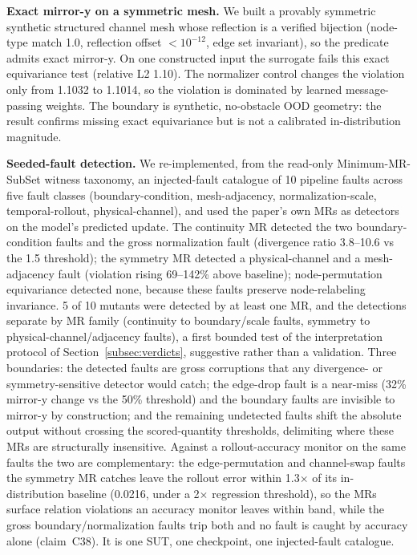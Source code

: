 \documentclass[preprint,12pt]{elsarticle}
\begin{document}
\textbf{Exact mirror-y on a symmetric mesh.} We built a provably symmetric synthetic structured channel mesh whose reflection is a verified bijection (node-type match 1.0, reflection offset $<10^{-12}$, edge set invariant), so the predicate admits exact mirror-y. On one constructed input the surrogate fails this exact equivariance test (relative L2 1.10). The normalizer control changes the violation only from 1.1032 to 1.1014, so the violation is dominated by learned message-passing weights. The boundary is synthetic, no-obstacle OOD geometry: the result confirms missing exact equivariance but is not a calibrated in-distribution magnitude.

\textbf{Seeded-fault detection.} We re-implemented, from the read-only Minimum-MR-SubSet witness taxonomy, an injected-fault catalogue of 10 pipeline faults across five fault classes (boundary-condition, mesh-adjacency, normalization-scale, temporal-rollout, physical-channel), and used the paper's own MRs as detectors on the model's predicted update. The continuity MR detected the two boundary-condition faults and the gross normalization fault (divergence ratio 3.8--10.6 vs the 1.5 threshold); the symmetry MR detected a physical-channel and a mesh-adjacency fault (violation rising 69--142\% above baseline); node-permutation equivariance detected none, because these faults preserve node-relabeling invariance. 5 of 10 mutants were detected by at least one MR, and the detections separate by MR family (continuity to boundary/scale faults, symmetry to physical-channel/adjacency faults), a first bounded test of the interpretation protocol of Section~\ref{subsec:verdicts}, suggestive rather than a validation. Three boundaries: the detected faults are gross corruptions that any divergence- or symmetry-sensitive detector would catch; the edge-drop fault is a near-miss (32\% mirror-y change vs the 50\% threshold) and the boundary faults are invisible to mirror-y by construction; and the remaining undetected faults shift the absolute output without crossing the scored-quantity thresholds, delimiting where these MRs are structurally insensitive. Against a rollout-accuracy monitor on the same faults the two are complementary: the edge-permutation and channel-swap faults the symmetry MR catches leave the rollout error within 1.3$\times$ of its in-distribution baseline (0.0216, under a 2$\times$ regression threshold), so the MRs surface relation violations an accuracy monitor leaves within band, while the gross boundary/normalization faults trip both and no fault is caught by accuracy alone (claim~C38). It is one SUT, one checkpoint, one injected-fault catalogue.
\end{document}
